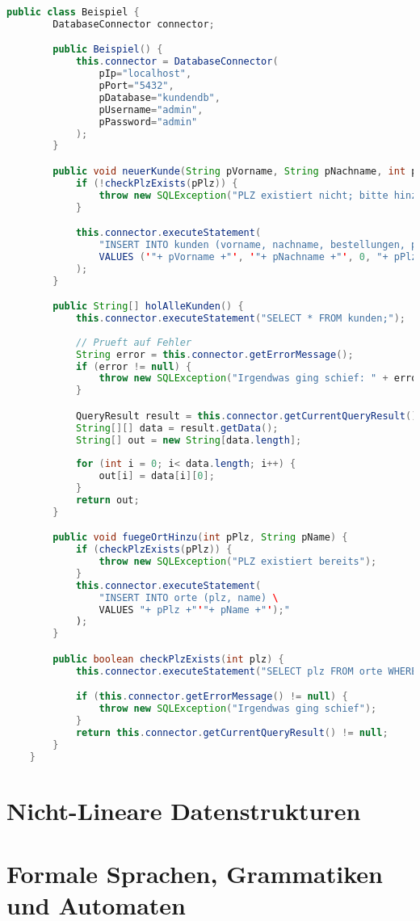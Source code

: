 \documentclass{article}
\begin{document}
	\begin{lstlisting}[language=Java]
	public class Beispiel {
		DatabaseConnector connector;

		public Beispiel() {
			this.connector = DatabaseConnector(
				pIp="localhost",
				pPort="5432",
				pDatabase="kundendb",
				pUsername="admin",
				pPassword="admin"
			);
		}

		public void neuerKunde(String pVorname, String pNachname, int pPlz) {
			if (!checkPlzExists(pPlz)) {
				throw new SQLException("PLZ existiert nicht; bitte hinzufuegen");
			}

			this.connector.executeStatement(
				"INSERT INTO kunden (vorname, nachname, bestellungen, plz) \
				VALUES ('"+ pVorname +"', '"+ pNachname +"', 0, "+ pPlz +");"
			);
		}

		public String[] holAlleKunden() {
			this.connector.executeStatement("SELECT * FROM kunden;");
		
			// Prueft auf Fehler
			String error = this.connector.getErrorMessage();
			if (error != null) {
				throw new SQLException("Irgendwas ging schief: " + error);
			}

			QueryResult result = this.connector.getCurrentQueryResult();
			String[][] data = result.getData();
			String[] out = new String[data.length];
		
			for (int i = 0; i< data.length; i++) {
				out[i] = data[i][0];
			}
			return out;
		}

		public void fuegeOrtHinzu(int pPlz, String pName) {
			if (checkPlzExists(pPlz)) {
				throw new SQLException("PLZ existiert bereits");
			}
			this.connector.executeStatement(
				"INSERT INTO orte (plz, name) \
				VALUES "+ pPlz +"'"+ pName +"');"
			);
		}

		public boolean checkPlzExists(int plz) {
			this.connector.executeStatement("SELECT plz FROM orte WHERE plz = " + String.valueOf(plz) + ";");

			if (this.connector.getErrorMessage() != null) {
				throw new SQLException("Irgendwas ging schief");
			}
			return this.connector.getCurrentQueryResult() != null;
		}
	}
	\end{lstlisting}


	\section{Nicht-Lineare Datenstrukturen}

	\section{Formale Sprachen, Grammatiken und Automaten}
	
\end{document}
